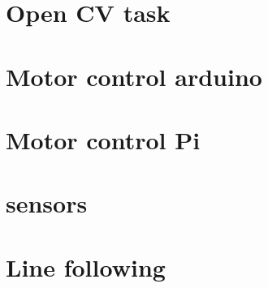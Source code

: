 	\section{Open CV task}
	\label{apx:open_cv_task}


	\section{Motor control arduino}
	\label{apx:arduino_motor_control}






	\section{Motor control Pi}
	\label{apx:pi_motor_control}







	\section{sensors}
	




	\section{Line following}
	



